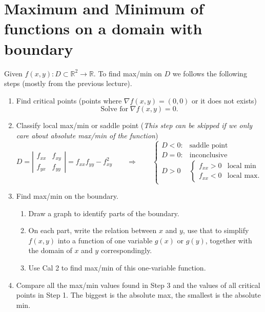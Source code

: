 
\setcounter{section}{16}
\section{Maximum and Minimum of functions on a domain with boundary}

Given $f(x,y):D\subset \mathbb{R}^2\to \mathbb{R}$. To find max/min on $D$ we follows the following steps (mostly from the previous lecture). 
\begin{enumerate}
    \item Find critical points (points where $\nabla f(x,y) = (0,0)$ or it does not exists)
    \begin{equation*}
        \text{Solve for}\;\nabla f(x,y) = 0.
    \end{equation*}
    \item Classify local max/min or saddle point (\emph{This step can be skipped if we only care about absolute max/min of the function}) 
    \begin{equation*}
        D = \left|\begin{array}{cc}
             f_{xx} & f_{xy}  \\
             f_{yx} & f_{yy} 
        \end{array}\right| = f_{xx}f_{yy} - f_{xy}^2 \qquad 
        \Longrightarrow\qquad 
        \begin{cases}
            D < 0: &\text{saddle point}    \\
            D = 0: &\text{inconclusive}    \\
            D > 0 
            & 
            \begin{cases}
            f_{xx} > 0 &\text{local min}\\
            f_{xx} < 0 &\text{local max}.
            \end{cases}
        \end{cases}
    \end{equation*}
    \item Find max/min on the boundary. 
    \begin{enumerate}
        \item Draw a graph to identify parts of the boundary.
        \item On each part, write the relation between $x$ and $y$, use that to simplify $f(x,y)$ into a function of one variable $g(x)$ or $g(y)$, together with the domain of $x$ and $y$ correspondingly.
        \item Use Cal 2 to find max/min of this one-variable function. 
    \end{enumerate}
    \item Compare all the max/min values found in Step 3 and the values of all critical points in Step 1. The biggest is the absolute max, the smallest is the absolute min.
\end{enumerate}

